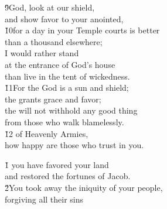 \begin{poetry}
\poeml \v{9}God, look at our shield, \\
\poemll    and show favor to your anointed, \\
\poeml \v{10}for a day in your Temple courts is better \\
\poemll    than a thousand elsewhere; \\
\poeml I would rather stand \\
\poemll    at the entrance of God's house \\
\poemlll       than live in the tent of wickedness. \\
\poeml \v{11}For the  God is a sun and shield; \\
\poemll    the  grants grace and favor; \\
\poeml the  will not withhold any good thing \\
\poemll    from those who walk blamelessly. \\
\poeml \v{12} of Heavenly Armies, \\
\poemll    how happy are those who trust in you.
\end{poetry}

\begin{poetry}
\poeml \v{1} you have favored your land \\
\poemll    and restored the fortunes of Jacob. \\
\poeml \v{2}You took away the iniquity of your people, \\
\poemll    forgiving all their sins
\end{poetry}


